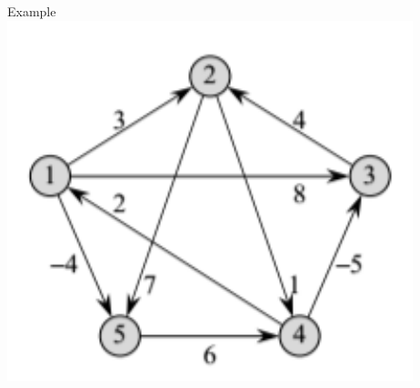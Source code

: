 \begin{frame}{Example}
    \includegraphics[scale=0.5]{images/graph-fw}
\end{frame}

\begin{frame}
\end{frame}

